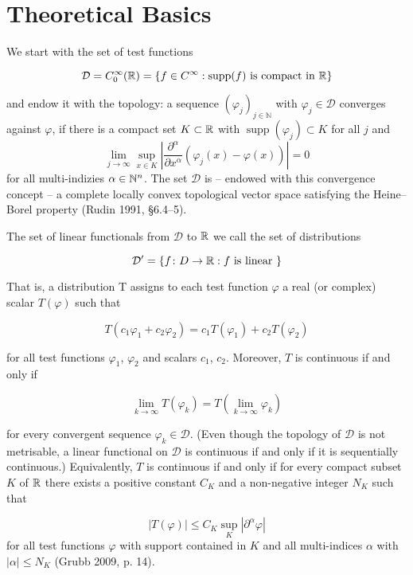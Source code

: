 \section{Theoretical Basics}

We start with the set of test functions

	\[ \mathcal{D} = C_{0}^{\infty}( \mathbb{R} ) = \{ f \in C^{\infty} : \operatorname{supp}(f) \text{ is compact in } \mathbb{R} \}  \]

and endow it with the topology: a sequence $ (\varphi_j)_{j\in \mathbb{N}}$ with $\varphi_j \in \mathcal{D}$ converges against ${\varphi}$, if there is a 
compact set $K \subset \mathbb{R}$ with $\operatorname{supp}(\varphi_j) \subset K$ for all $j$ and
	\[ \lim_{j \rightarrow \infty} \sup_{x\in K} \left| \frac{\partial^\alpha}{\partial x^\alpha} \left( \varphi_j (x) - \varphi(x) \right) \right| = 0 \]
for all multi-indizies $\alpha \in \mathbb{N}^n$. The set $\mathcal{D}$ is – endowed with this convergence concept – a  complete locally convex topological vector space satisfying the Heine–Borel property (Rudin 1991, §6.4–5).
\newline

The set of linear functionals from $\mathcal{D}$ to $\mathbb{R}$ we call the set of distributions

	\[ \mathcal{D}' = \{ f \colon D \to \mathbb{R} : f \text{ is linear } \} \]
	
That is, a distribution T assigns to each test function $\varphi$ a real (or complex) scalar $T(\varphi)$  such that

 	\[ T(c_{1} \varphi_{1} + c_{2} \varphi_{2}) = c_{1} T(\varphi_{1}) + c_{2} T(\varphi_{2}) \] 
 	
for all test functions $\varphi_{1}$, $\varphi_{2}$ and scalars $c_{1}$, $c_{2}$. Moreover, $T$ is continuous if and only if

	\[ \lim_{k \to \infty} T(\varphi_{k}) = T \left( \lim_{k \to \infty} \varphi_{k} \right) \]
	
for every convergent sequence $\varphi_{k} \in \mathcal{D}$. (Even though the topology of $\mathcal{D}$ is not metrisable, a linear functional on $\mathcal{D}$ is continuous if and only if it is sequentially continuous.) Equivalently, $T$ is continuous if and only if for every compact subset $K$ of $\mathbb{R}$ there exists a positive constant $C_{K}$ and a non-negative integer $N_{K}$ such that
	
	\[ | T(\varphi) | \leq C_{K} \sup_K | \partial^{\alpha} \varphi | \]
for all test functions $\varphi$ with support contained in $K$ and all multi-indices $\alpha$ with $| \alpha | \leq N_{K}$ (Grubb 2009, p. 14).
\newline
	
